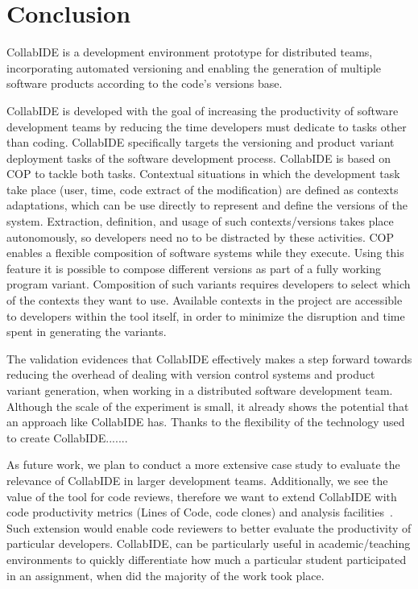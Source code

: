 
\section{Conclusion}
\label{sec:conclusion}

CollabIDE is a development environment prototype for distributed teams, incorporating automated versioning and enabling the generation of multiple software products according to the code's versions base.

CollabIDE is developed with the goal of increasing the productivity of software development teams by reducing the time developers must dedicate to tasks other than coding. CollabIDE specifically targets the versioning and product variant deployment tasks of the software development process. CollabIDE is based on \ac{COP} to tackle both tasks. Contextual situations in which the development task take place (\eg user, time, code extract of the modification) are defined as contexts adaptations, which can be use directly to represent and define the versions of the system. Extraction, definition, and usage of such contexts/versions takes place autonomously, so developers need no to be distracted by these activities. 
\ac{COP} enables a flexible composition of software systems while they execute. Using this feature it is possible to compose different versions as part of a fully working program variant. Composition of such variants requires developers to select which of the contexts they want to use. Available contexts in the project are accessible to developers within the tool itself, in order to minimize the disruption and time spent in generating the variants.

The validation evidences that CollabIDE effectively makes a step forward towards reducing the overhead of dealing with version control systems and product variant generation, when working in a distributed software development team.
Although the scale of the experiment is small, it already shows the potential that an approach like 
CollabIDE has. Thanks to the flexibility of the technology used to create CollabIDE.......

As future work, we plan to conduct a more extensive case study to evaluate the relevance of CollabIDE in larger development teams. Additionally, we see the value of the tool for code reviews, therefore we want to extend CollabIDE with code productivity metrics (\eg Lines of Code, code clones) and analysis facilities~\cite{lienhard12}. Such extension would enable code reviewers to better evaluate the productivity of particular developers. CollabIDE, can be particularly useful in academic/teaching environments to quickly differentiate how much a particular student participated in an assignment, when did the majority of the work took place.

\endinput
